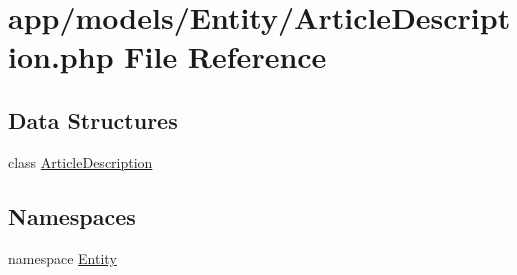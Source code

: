 \hypertarget{_article_description_8php}{\section{app/models/\-Entity/\-Article\-Description.php File Reference}
\label{_article_description_8php}
}
\subsection*{Data Structures}
\begin{DoxyCompactItemize}
\item 
class \hyperlink{class_entity_1_1_article_description}{Article\-Description}
\end{DoxyCompactItemize}
\subsection*{Namespaces}
\begin{DoxyCompactItemize}
\item 
namespace \hyperlink{namespace_entity}{Entity}
\end{DoxyCompactItemize}
